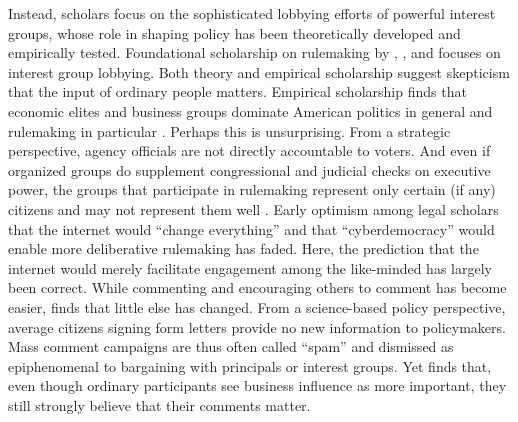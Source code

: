 Instead, scholars focus on the sophisticated lobbying efforts of powerful interest groups, whose role in shaping policy has been theoretically developed and empirically tested.
Foundational scholarship on rulemaking by \citet{Furlong2004}, \citet{Furlong1997, Furlong1998}, and \citet{Kerwin2011} focuses on interest group lobbying. Both theory and empirical scholarship suggest skepticism that the input of ordinary people matters. 
Empirical scholarship finds that economic elites and business groups dominate American politics in general \citep{Gilens2014} and rulemaking in particular \citep{Crow2015, Wagner2011, West2009, Yackee2006JOP, Yackee2006JPART, Yackee2012, Golden1998, Haeder2015}. Perhaps this is unsurprising. 
From a strategic perspective, agency officials are not directly accountable to voters. And even if organized groups do supplement congressional and judicial checks on executive power, the groups that participate in rulemaking represent only certain (if any) citizens and may not represent them well \citep{Seifter2016UCLA}. Early optimism among legal scholars that the internet would ``change everything'' \citep{Johnson1998} and that ``cyberdemocracy''  would enable more deliberative rulemaking has faded.  Here, the prediction that the internet would merely facilitate engagement among the like-minded \citep{Sunstein2001} has largely been correct. While commenting and encouraging others to comment has become easier, \citet{Coglianese2006} finds that little else has changed. 
From a science-based policy perspective, average citizens signing form letters provide no new information to policymakers. 
Mass comment campaigns are thus often called ``spam'' \citep{Balla2018} and dismissed as epiphenomenal to bargaining with principals or interest groups. 
Yet \citet{Yackee2015JPART} finds that, even though ordinary participants see business influence as more important, they still strongly believe that their comments matter.

